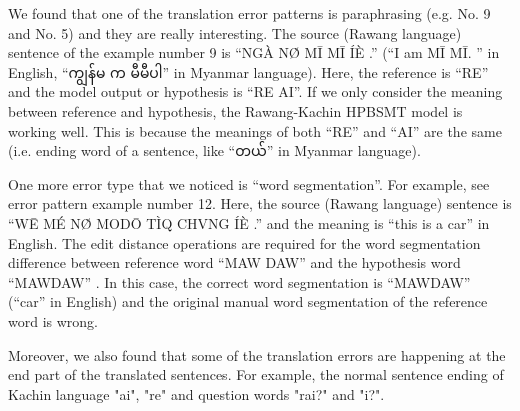 \documentclass[conference]{IEEEtran}
\newcommand{\quotes}[1]{``#1''}
\begin{document}
We found that one of the translation error patterns is paraphrasing (e.g. No. 9 and No. 5) and they are really interesting. The source (Rawang language) sentence of the example number 9 is \quotes{NGÀ NØ̀ MĪ MĪ ÍÈ .} (\quotes{I am MĪ MĪ. } in English, \quotes{{\padauktext ကျွန်မ က မီမီပါ}} in Myanmar language). Here, the reference is \quotes{RE} and the model output or hypothesis is \quotes{RE AI}. If we only consider the meaning between reference and hypothesis, the Rawang-Kachin HPBSMT model is working well. This is because the meanings of both \quotes{RE} and \quotes{AI} are the same (i.e. ending word of a sentence, like \quotes{{\padauktext တယ်}} in Myanmar language). 

One more error type that we noticed is \quotes{word segmentation}. For example, see error pattern example number 12. Here, the source (Rawang language) sentence is \quotes{WĒ MÉ NØ̀ MODŌ TÌQ CHVNG ÍÈ .} and the meaning is \quotes{this is a car} in English. The edit distance operations are required for the word segmentation difference between reference word \quotes{MAW DAW} and the hypothesis word \quotes{MAWDAW} . In this case, the correct word segmentation is \quotes{MAWDAW} (\quotes{car} in English) and the original manual word segmentation of the reference word is wrong.

Moreover, we also found that some of the translation errors are happening at the end part of the translated sentences. For example, the normal sentence ending of Kachin language "ai", "re" and question words "rai?" and "i?".




\end{document}
